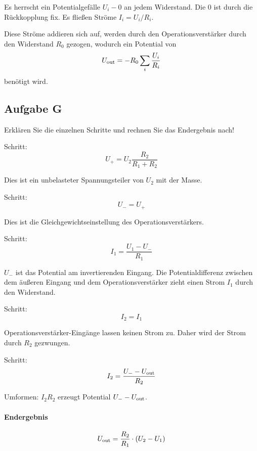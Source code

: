 Es herrscht ein Potentialgefälle $U_i - 0$ an jedem Widerstand. Die 0 ist
durch die Rückkopplung fix. Es fließen Ströme $I_i = U_i / R_i$.

Diese Ströme addieren sich auf, werden durch den Operationsverstärker durch den
Widerstand $R_0$ gezogen, wodurch ein Potential von
\[
	U_\text{out} = - R_0 \sum_i \frac{U_i}{R_i}
\]
benötigt wird.

\subsection{Aufgabe G}
\label{ssec:Aufgabe_G}

\begin{problem}
	Erklären Sie die einzelnen Schritte und rechnen Sie das Endergebnis nach!
\end{problem}

Schritt:
\begin{equation}
	\label{eq:G1}
	U_+ = U_2 \frac{R_2}{R_1 + R_2}
\end{equation}

Dies ist ein unbelasteter Spannungsteiler von $U_2$ mit der Masse.

Schritt:
\begin{equation}
	\label{eq:G2}
	U_- = U_+
\end{equation}

Dies ist die Gleichgewichtseinstellung des Operationsverstärkers.

Schritt:
\begin{equation}
	\label{eq:G3}
	I_1 = \frac{U_1 - U_-}{R_1}
\end{equation}

$U_-$ ist das Potential am invertierenden Eingang. Die Potentialdifferenz
zwischen dem äußeren Eingang und dem Operationsverstärker zieht einen Strom
$I_1$ durch den Widerstand.

Schritt:
\begin{equation}
	\label{eq:G4}
	I_2 = I_1
\end{equation}

Operationsverstärker-Eingänge lassen keinen Strom zu. Daher wird der Strom
durch $R_2$ gezwungen.

Schritt:
\begin{equation}
	\label{eq:G5}
	I_2 = \frac{U_- - U_\text{out}}{R_2}
\end{equation}

Umformen: $I_2 R_2$ erzeugt Potential $U_- - U_\text{out}$.

\paragraph{Endergebnis}
\[
	U_\text{out} = \frac{R_2}{R_1} \cdot (U_2 - U_1)
\]

